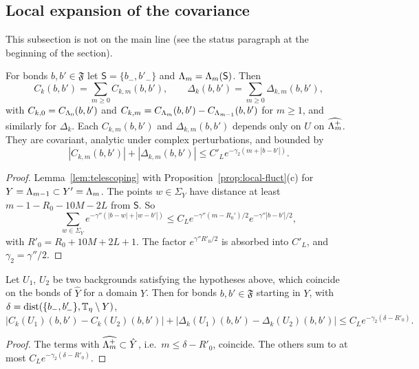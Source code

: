 \subsection{Local expansion of the covariance}\label{subsec:local-cov-expansion}

This subsection is not on the main line (see the status paragraph at the beginning of the section).

\begin{theorem}\label{thm:local-covariance}
For bonds $b,b'\in\mathfrak F$ let $\mathsf S=\{b_-,b'_-\}$ and $\Lambda_m=\Lambda_m(\mathsf S)$. Then
\[
C_k(b,b')=\sum_{m\ge0}C_{k,m}(b,b'),\qquad\Delta_k(b,b')=\sum_{m\ge0}\Delta_{k,m}(b,b'),
\]
with $C_{k,0}=C_{\Lambda_0}(b,b')$ and $C_{k,m}=C_{\Lambda_m}(b,b')-C_{\Lambda_{m-1}}(b,b')$ for $m\ge1$, and similarly for $\Delta_k$. Each $C_{k,m}(b,b')$ and $\Delta_{k,m}(b,b')$ depends only on $U$ on $\widehat{\Lambda_m^+}$. They are covariant, analytic under complex perturbations, and bounded by
\[
|C_{k,m}(b,b')|+|\Delta_{k,m}(b,b')|\le C'_Le^{-\gamma_2(m+|b-b'|)} .
\]
\end{theorem}

\begin{proof}
Lemma~\ref{lem:telescoping} with Proposition~\ref{prop:local-fluct}(c) for $Y=\Lambda_{m-1}\subset Y'=\Lambda_m$. The points $w\in\Sigma_Y$ have distance at least $m-1-R_0-10M-2L$ from $\mathsf S$. So
\[
\sum_{w\in\Sigma_Y}e^{-\gamma''(|b-w|+|w-b'|)}\le C_Le^{-\gamma''(m-R_0')/2}e^{-\gamma''|b-b'|/2},
\]
with $R'_0=R_0+10M+2L+1$. The factor $e^{\gamma''R'_0/2}$ is absorbed into $C'_L$, and $\gamma_2=\gamma''/2$.
\end{proof}

\begin{corollary}\label{cor:large-changes}
Let $U_1$, $U_2$ be two backgrounds satisfying the hypotheses above, which coincide on the bonds of $\hat Y$ for a domain $Y$. Then for bonds $b,b'\in\mathfrak F$ starting in $Y$, with $\delta=\operatorname{dist}(\{b_-,b'_-\},\mathbb T_\eta\setminus Y)$,
\[
|C_k(U_1)(b,b')-C_k(U_2)(b,b')|+|\Delta_k(U_1)(b,b')-\Delta_k(U_2)(b,b')|\le C_Le^{-\gamma_2(\delta-R'_0)} .
\]
\end{corollary}

\begin{proof}
The terms with $\widehat{\Lambda_m^+}\subset\hat Y$, i.e.\ $m\le\delta-R'_0$, coincide. The others sum to at most $C_Le^{-\gamma_2(\delta-R'_0)}$.
\end{proof}

